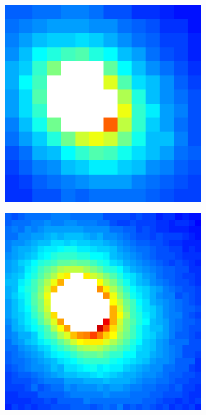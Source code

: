 \documentclass[letterpaper,12pt]{article}
\begin{document}
\begin{figure}[h]
    \centering
    \begin{subfigure}[b]{0.35\textwidth}
    	\centering
        \includegraphics[width=0.95\textwidth]{Interpolation_0p25.PNG}
        \caption{}
        \label{fig:Interpolation_0p25}
    \end{subfigure}
    \begin{subfigure}[b]{0.35\textwidth}
    	\centering
        \includegraphics[width=0.95\textwidth]{Interpolation_0p5.PNG}
        \caption{}
        \label{fig:Interpolation_0p5}
    \end{subfigure}
    

\end{figure}
\end{document}
